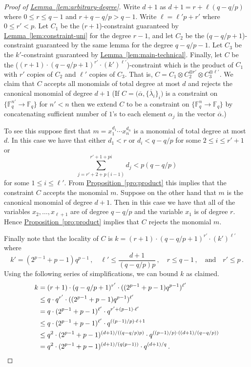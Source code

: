 \documentclass[10pt]{article}
\theoremstyle{definition}
\numberwithin{equation}{section}
\newcommand{\expref}[2]{\texorpdfstring{\hyperref[#2]{#1~\ref{#2}}}{#1~\ref{#2}}}
\newcommand{\F}{{\mathbb{F}}}
\newcommand{\bset}[1]{\bigl\{{#1}\bigr\}}
\begin{document}
\begin{proof}[Proof of \expref{Lemma}{lem:arbitrary-degree}]
Write $d+1$ as $d+1 = r+ \ell (q-q/p) $ where $0 \leq r \leq q-1$ and $r+q-q/p > q-1$. Write $\ell = \ell' p + r'$ where $0 \leq r' < p$.
Let $C_1$ be the ($r+1$)-constraint guaranteed by \expref{Lemma}{lem:constraint-uni} for the degree $r-1$, and let $C_2$
be the ($q-q/p+1$)-constraint guaranteed by the same lemma for the degree $q-q/p-1$. Let $C_3$ be
the $k'$-constraint guaranteed by \expref{Lemma}{lem:main-technical}.
Finally, let $C$ be the ($(r+1)\cdot (q-q/p+1)^{r'} \cdot (k')^{\ell'}$)-constraint which is the
product of $C_1$ with $r'$ copies of $C_2$ and $\ell'$ copies of $C_3$. That is,
$C =C_1 \otimes C_2^{\otimes r'} \otimes C_3^{\otimes \ell'}$.
We claim that $C$ accepts all monomials of total degree at most $d$ and rejects the canonical monomial of degree $d+1$
(If $C=\big(\overline \alpha, \bset{\overline \lambda_i }_i)$ is  a constraint on $\{\F_q^{n'} \to \F_q\}$ for $n' <n$ then we extend $C$ to be a constraint on $\{ \F_q^n \to \F_q \}$ by concatenating sufficient number of $1$'s
to each element $\alpha_j$ in the vector $\overline \alpha$.)

To see this suppose first that $m=x_1^{d_1} \cdots x_{n}^{d_n}$ is a monomial of total degree at most $d$.
In this case we have that either $d_1<r$ or $d_i <q-q/p$ for some $2
\leq i \leq r'+1$ or 
\[
\sum_{j=r' + 2 + p(i-1)}^{r' +1+pi} d_j < p(q-q/p)
\]
for some
$1 \leq i \leq \ell'$.
%
%
{}From \expref{Proposition}{pro:product} this implies that
the constraint $C$ accepts the monomial $m$. Suppose on the other  hand that $m$ is
the canonical monomial of degree $d+1$.  Then in this case we have that all
of the variables $x_2,\ldots, x_{\ell+1}$ are of degree $q-q/p$ and the variable $x_{1}$ is of degree $r$. Hence \expref{Proposition}{pro:product} implies that $C$ rejects the monomial $m$.


Finally note that the locality of $C$ is $k=(r+1)\cdot (q-q/p+1)^{r'}
\cdot (k')^{\ell'}$ where
\[
k' = (2^{p-1}+p-1)q^{p-1}\,,\quad \ell' \leq \frac{d+1}{(q-q/p)p}\,,\quad
r \leq q-1\,,\quad\text{and}\quad r' \leq p\,.
\]
Using the following series of simplifications, we can bound $k$ as claimed.
\begin{align*}
k
& =  (r+1)\cdot (q-q/p+1)^{r'} \cdot ((2^{p-1}+p-1)q^{p-1})^{\ell'} \\
& \leq  q \cdot q^{r'} \cdot ((2^{p-1}+p-1)q^{p-1})^{\ell'} \\
& =  q \cdot (2^{p-1}+p-1)^{\ell'} \cdot q^{r' + (p-1)\cdot \ell'} \\
& \leq  q \cdot (2^{p-1}+p-1)^{\ell'} \cdot q^{((p-1)/p) \cdot \ell + 1}\\
& \leq  q^2 \cdot (2^{p-1}+p-1)^{(d+1)/((q-q/p)p)} \cdot q^{((p-1)/p) \cdot ((d+1)/(q-q/p))}\\
& =  q^2 \cdot (2^{p-1}+p-1)^{(d+1)/(q(p-1))} \cdot q^{(d+1)/q}\,.\qedhere
\end{align*}
\end{proof}
\end{document}
